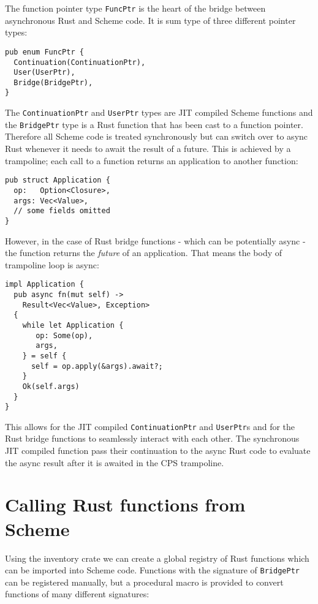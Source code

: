 \documentclass[sigplan]{acmart}
\begin{document}
The function pointer type \texttt{FuncPtr} is the heart of the bridge between
asynchronous Rust and Scheme code. It is sum type of three different pointer
types:

\begin{verbatim}
pub enum FuncPtr {
  Continuation(ContinuationPtr),
  User(UserPtr),
  Bridge(BridgePtr),
}
\end{verbatim}

The \texttt{ContinuationPtr} and \texttt{UserPtr} types are JIT compiled
Scheme functions and the \texttt{BridgePtr} type is a Rust function that has
been cast to a function pointer. Therefore all Scheme code is treated
synchronously but can switch over to async Rust whenever it needs to await the
result of a future. This is achieved by a trampoline; each call to a function
returns an application to another function:

\begin{verbatim}
pub struct Application {
  op:   Option<Closure>,
  args: Vec<Value>,
  // some fields omitted 
}
\end{verbatim}

However, in the case of Rust bridge functions - which can be potentially async -
the function returns the \textit{future} of an application. That means the body of
trampoline loop is async:

\begin{verbatim}
impl Application {
  pub async fn(mut self) ->
    Result<Vec<Value>, Exception>
  {
    while let Application {
       op: Some(op),
       args,
    } = self {
      self = op.apply(&args).await?;
    }
    Ok(self.args)
  }
}
\end{verbatim}

This allows for the JIT compiled \texttt{ContinuationPtr} and
\texttt{UserPtr}s and for the Rust bridge functions to seamlessly interact
with each other. The synchronous JIT compiled function pass their continuation
to the async Rust code to evaluate the async result after it is awaited in the
CPS trampoline.

\section{Calling Rust functions from Scheme}

Using the inventory \cite{inventory} crate we can create a global registry of Rust
functions which can be imported into Scheme code. Functions with the signature of
\texttt{BridgePtr} can be registered manually, but a procedural macro is provided
to convert functions of many different signatures:
\end{document}
